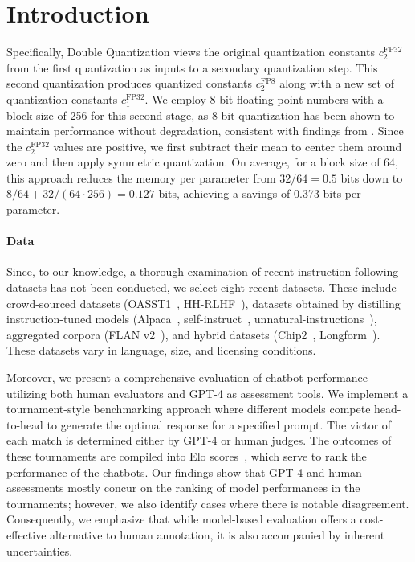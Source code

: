 \section{Introduction}

Specifically, Double Quantization views the original quantization constants $c_2^{\text{FP32}}$ from the first quantization as inputs to a secondary quantization step. This second quantization produces quantized constants $c_2^{\text{FP8}}$ along with a new set of quantization constants $c_1^{\text{FP32}}$. We employ 8-bit floating point numbers with a block size of 256 for this second stage, as 8-bit quantization has been shown to maintain performance without degradation, consistent with findings from \citet{dettmers2022case}. Since the $c_2^{\text{FP32}}$ values are positive, we first subtract their mean to center them around zero and then apply symmetric quantization. On average, for a block size of 64, this approach reduces the memory per parameter from $32/64 = 0.5$ bits down to $8/64 + 32/(64 \cdot 256) = 0.127$ bits, achieving a savings of 0.373 bits per parameter.

\paragraph{Data} Since, to our knowledge, a thorough examination of recent instruction-following datasets has not been conducted, we select eight recent datasets. These include crowd-sourced datasets (OASST1~\citep{kopf2023openassistant}, HH-RLHF~\citep{bai2022training}), datasets obtained by distilling instruction-tuned models (Alpaca~\citep{alpaca}, self-instruct~\citep{wang2022self}, unnatural-instructions~\citep{honovich2022unnatural}), aggregated corpora (FLAN v2~\citep{chung2022scaling}), and hybrid datasets (Chip2~\citep{laion2023}, Longform~\citep{koksal2023longform}). These datasets vary in language, size, and licensing conditions.

Moreover, we present a comprehensive evaluation of chatbot performance utilizing both human evaluators and GPT-4 as assessment tools. We implement a tournament-style benchmarking approach where different models compete head-to-head to generate the optimal response for a specified prompt. The victor of each match is determined either by GPT-4 or human judges. The outcomes of these tournaments are compiled into Elo scores~\citep{elo1967proposed, elo1978rating}, which serve to rank the performance of the chatbots. Our findings show that GPT-4 and human assessments mostly concur on the ranking of model performances in the tournaments; however, we also identify cases where there is notable disagreement. Consequently, we emphasize that while model-based evaluation offers a cost-effective alternative to human annotation, it is also accompanied by inherent uncertainties.

